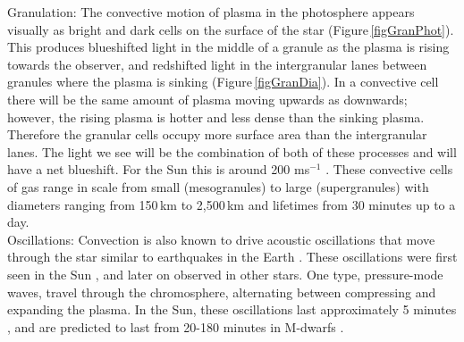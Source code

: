 Granulation: The convective motion of plasma in the photosphere appears visually as bright and dark cells on the surface of the star (Figure\,\ref{figGranPhot}). This produces blueshifted light in the middle of a granule as the plasma is rising towards the observer, and redshifted light in the intergranular lanes between granules where the plasma is sinking (Figure\,\ref{figGranDia}). In a convective cell there will be the same amount of plasma moving upwards as downwards; however, the rising plasma is hotter and less dense than the sinking plasma. Therefore the granular cells occupy more surface area than the intergranular lanes. The light we see will be the combination of both of these processes and will have a net blueshift. For the Sun this is around 200 ms$^{-1}$ \citep{2010Meunier}. These convective cells of gas range in scale from small (mesogranules) to large (supergranules) with diameters ranging from 150\,km to 2,500\,km and lifetimes from 30 minutes up to a day. \\

Oscillations: Convection is also known to drive acoustic oscillations that move through the star similar to earthquakes in the Earth \citep{1980Cox}. These oscillations were first seen in the Sun \citep{1962Leighton}, and later on observed in other stars. One type, pressure-mode waves\citep{1941Cowling}, travel through the chromosphere, alternating between compressing and expanding the plasma. In the Sun, these oscillations last approximately 5 minutes \citep{1962Leighton}, and are predicted to last from 20-180 minutes in M-dwarfs \citep{2019Rodriguez}.\\

